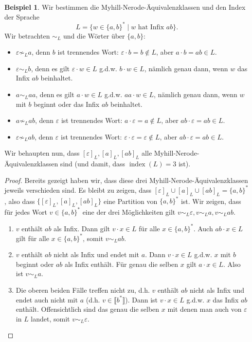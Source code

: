 \documentclass[11pt, a4paper]{article}
\theoremstyle{definition}
\newtheorem{example}[definition]{Beispiel}
\theoremstyle{plain}
\numberwithin{equation}{section}
\DeclareMathOperator{\ind}{index}
\begin{document}
\begin{example}\label{exp:mnf2reg}
	Wir bestimmen die Myhill-Nerode-Äquivalenzklassen und den Index der Sprache 
	$$
		L = \{w \in \{a, b\}^\ast \mid w \text{ hat Infix } ab\}.
	$$
	Wir betrachten $\sim_L$ und die Wörter über $\{a, b\}$:
	\begin{itemize}
		\item $\varepsilon \not\sim_L a$, denn $b$ ist trennendes Wort: $\varepsilon \cdot b = b \notin L$, aber $a \cdot b = ab \in L$.
		\item $\varepsilon \sim_L b$, denn es gilt $\varepsilon \cdot w \in L$  g.d.w. $b \cdot w \in L$, nämlich genau dann, wenn $w$ das Infix $ab$ beinhaltet.
		\item $a \sim_L aa$, denn es gilt $a \cdot w \in L$ g.d.w. $aa \cdot w \in L$, nämlich genau dann, wenn $w$ mit $b$ beginnt oder das Infix $ab$ beinhaltet.
		\item $a \not\sim_L ab$, denn $\varepsilon$ ist trennendes Wort: $a \cdot \varepsilon = a \notin L$, aber $ab \cdot \varepsilon = ab \in L$.
		\item $\varepsilon \not\sim_L ab$, denn $\varepsilon$ ist trennendes Wort: $\varepsilon \cdot \varepsilon = \varepsilon \notin L$, aber $ab \cdot \varepsilon = ab \in L$.
	\end{itemize}
	Wir behaupten nun, dass $[\varepsilon]_L, [a]_L, [ab]_L$ alle Myhill-Nerode-Äquivalenzklassen sind (und damit, dass $\ind(L) = 3$ ist).
	\begin{proof}
		Bereits gezeigt haben wir, dass diese drei Myhill-Nerode-Äquivalenzklassen jeweils verschieden sind. Es bleibt zu zeigen, dass $[\varepsilon]_L \cup [a]_L \cup [ab]_L = \{a, b\}^\ast$, also dass $\{[\varepsilon]_L, [a]_L, [ab]_L\}$ eine Partition von $\{a, b\}^\ast$ ist. Wir zeigen, dass für jedes Wort $v \in \{a, b\}^\ast$ eine der drei Möglichkeiten gilt $v \sim_L \varepsilon, v \sim_L a, v \sim_L ab$.
		\begin{enumerate}[label=\arabic*)]
			\item $v$ enthält $ab$ als Infix. Dann gilt $v \cdot x \in L$ für alle $x \in\{a, b\}^\ast$. Auch $ab \cdot x \in L$ gilt für alle $x \in \{a, b\}^\ast$, somit $v \sim_L ab$.
			\item $v$ enthält $ab$ nicht als Infix und endet mit $a$. Dann $v \cdot x \in L$ g.d.w. $x$ mit $b$ beginnt oder $ab$ als Infix enthält. Für genau die selben $x$ gilt $a \cdot x \in L$. Also ist $v \sim_L a$.
			\item Die oberen beiden Fälle treffen nicht zu, d.h. $v$ enthält $ab$ nicht als Infix und endet auch nicht mit $a$ (d.h. $v \in \llbracket b^\ast \rrbracket$). Dann ist $v \cdot x \in L$ g.d.w. $x$ das Infix $ab$ enthält. Offensichtlich sind das genau die selben $x$ mit denen man auch von $\varepsilon$ in $L$ landet, somit $v \sim_L \varepsilon$.

\end{enumerate}
\end{proof}
\end{example}
\end{document}
